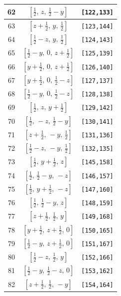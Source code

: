 \documentclass[fleqn,8pt]{jsarticle}
\begin{document}
\begin{longtable}{ccc}
62 & $\left[ \frac{1}{2},\, z,\, \frac{1}{2} - y \right]$ & {\tt [122,133]} \\ \hline
63 & $\left[ z + \frac{1}{2},\, y,\, \frac{1}{2} \right]$ & {\tt [123,144]} \\ \hline
64 & $\left[ \frac{1}{2} - z,\, y,\, \frac{1}{2} \right]$ & {\tt [124,143]} \\ \hline
65 & $\left[ \frac{1}{2} - y,\, 0,\, z + \frac{1}{2} \right]$ & {\tt [125,139]} \\ \hline
66 & $\left[ y + \frac{1}{2},\, 0,\, z + \frac{1}{2} \right]$ & {\tt [126,140]} \\ \hline
67 & $\left[ y + \frac{1}{2},\, 0,\, \frac{1}{2} - z \right]$ & {\tt [127,137]} \\ \hline
68 & $\left[ \frac{1}{2} - y,\, 0,\, \frac{1}{2} - z \right]$ & {\tt [128,138]} \\ \hline
69 & $\left[ \frac{1}{2},\, z,\, y + \frac{1}{2} \right]$ & {\tt [129,142]} \\ \hline
70 & $\left[ \frac{1}{2},\, - z,\, \frac{1}{2} - y \right]$ & {\tt [130,141]} \\ \hline
71 & $\left[ z + \frac{1}{2},\, - y,\, \frac{1}{2} \right]$ & {\tt [131,136]} \\ \hline
72 & $\left[ \frac{1}{2} - z,\, - y,\, \frac{1}{2} \right]$ & {\tt [132,135]} \\ \hline
73 & $\left[ \frac{1}{2},\, y + \frac{1}{2},\, z \right]$ & {\tt [145,158]} \\ \hline
74 & $\left[ \frac{1}{2},\, \frac{1}{2} - y,\, - z \right]$ & {\tt [146,157]} \\ \hline
75 & $\left[ \frac{1}{2},\, y + \frac{1}{2},\, - z \right]$ & {\tt [147,160]} \\ \hline
76 & $\left[ \frac{1}{2},\, \frac{1}{2} - y,\, z \right]$ & {\tt [148,159]} \\ \hline
77 & $\left[ z + \frac{1}{2},\, \frac{1}{2},\, y \right]$ & {\tt [149,168]} \\ \hline
78 & $\left[ y + \frac{1}{2},\, z + \frac{1}{2},\, 0 \right]$ & {\tt [150,165]} \\ \hline
79 & $\left[ \frac{1}{2} - y,\, z + \frac{1}{2},\, 0 \right]$ & {\tt [151,167]} \\ \hline
80 & $\left[ \frac{1}{2} - z,\, \frac{1}{2},\, y \right]$ & {\tt [152,166]} \\ \hline
81 & $\left[ \frac{1}{2} - y,\, \frac{1}{2} - z,\, 0 \right]$ & {\tt [153,162]} \\ \hline
82 & $\left[ z + \frac{1}{2},\, \frac{1}{2},\, - y \right]$ & {\tt [154,164]} \\ \hline

\end{longtable}
\end{document}
